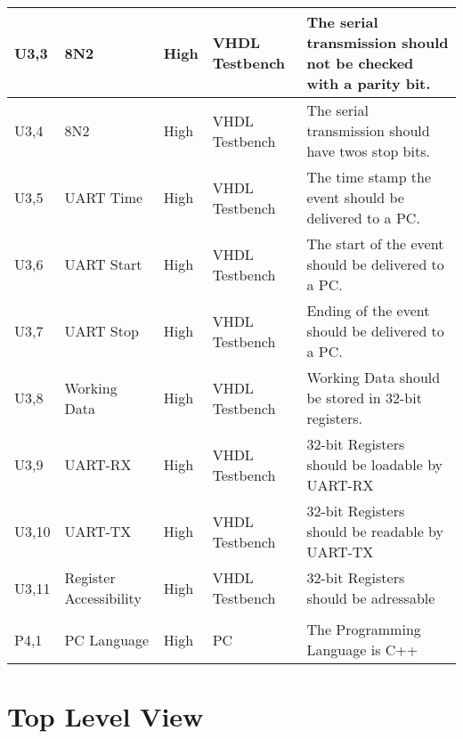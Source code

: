 \documentclass{report}
\begin{document}
\begin{table}[ht!]
\begin{center}
\begin{tabular}{ |P{0,7cm}|P{2,5cm}|P{2cm}|P{2,8cm} |P{8cm}|}
 \hline
{}U3,3  &  8N2 & High & VHDL Testbench & The serial transmission should not be checked with a parity bit.  \\
 \hline
{}U3,4  &  8N2 & High & VHDL Testbench & The serial transmission should have twos stop bits.  \\
 \hline
{}U3,5  &  UART Time & High & VHDL Testbench & The time stamp the event should be delivered to a PC.  \\
 \hline
{}U3,6  &  UART Start & High & VHDL Testbench & The start of the event should be delivered to a PC.  \\
 \hline
{}U3,7  &  UART Stop & High & VHDL Testbench & Ending of the event should be delivered to a PC.  \\
 \hline
{}U3,8  &  Working Data & High & VHDL Testbench & Working Data should be stored in 32-bit registers. \\
 \hline
{}U3,9  &  UART-RX & High & VHDL Testbench & 32-bit Registers should be loadable by UART-RX\\
 \hline
{}U3,10  &  UART-TX & High & VHDL Testbench & 32-bit Registers should be readable by UART-TX\\
 \hline
{}U3,11 &  Register Accessibility & High & VHDL Testbench & 32-bit Registers should be adressable\\
 \hline
 \hline
 \\
\hline
{}P4,1 &  PC Language & High & PC & The Programming Language is C++\\
 \hline

\end{tabular}
\end{center}
\end{table}
\newpage

\chapter{Top Level View}
\end{document}
